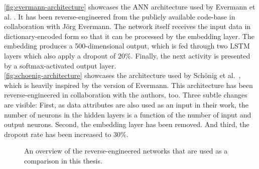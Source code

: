 \autoref{fig:evermann-architecture} showcases the ANN architecture used by Evermann et al. \cite{evermann2016}. It has been reverse-engineered from the publicly available code-base \cite{web:evermann} in collaboration with Jörg Evermann. The network itself receives the input data in dictionary-encoded form so that it can be processed by the embedding layer. The embedding produces a 500-dimensional output, which is fed through two LSTM layers which also apply a dropout of $20\%$. Finally, the next activity is presented by a softmax-activated output layer.\\

\autoref{fig:schoenig-architecture} showcases the architecture used by Schönig et al.~\cite{schoenig2018}, which is heavily inspired by the version of Evermann. This architecture has been reverse-engineered in collaboration with the authors, too. Three subtle changes are visible: First, as data attributes are also used as an input in their work, the number of neurons in the hidden layers is a function of the number of input and output neurons. Second, the embedding layer has been removed. And third, the dropout rate has been increased to $30\%$.

\begin{figure}
\centering
{}
\qquad
{}
\caption{An overview of the reverse-engineered networks that are used as a comparison in this thesis.}
\label{fig:architectures}
\end{figure}

